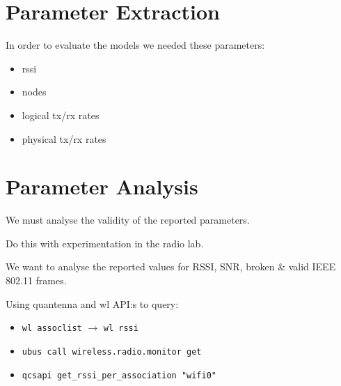 \section{Parameter Extraction}

In order to evaluate the models we needed these parameters:

\begin{itemize}
\item rssi
\item nodes
\item logical tx/rx rates
\item physical tx/rx rates
\end{itemize}

\section{Parameter Analysis}

We must analyse the validity of the reported parameters.

Do this with experimentation in the radio lab.

We want to analyse the reported values for RSSI, SNR, broken \& valid IEEE 802.11 frames.

Using quantenna and wl API:s to query:
\begin{itemize}
    \item \texttt{wl assoclist} $\rightarrow$ \texttt{wl rssi}
    \item \texttt{ubus call wireless.radio.monitor get}
    \item \texttt{qcsapi get\_rssi\_per\_association "wifi0"}
\end{itemize}
